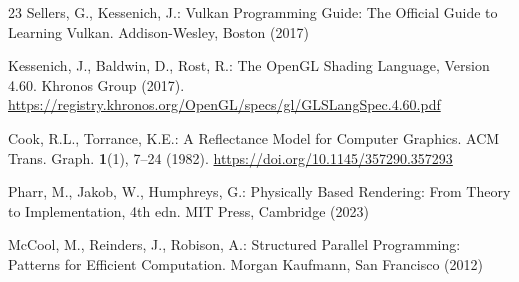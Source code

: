 \documentclass{svproc}
\begin{document}
\begin{thebibliography}{23}
Sellers, G., Kessenich, J.: Vulkan Programming Guide: The Official Guide to Learning Vulkan.
Addison-Wesley, Boston (2017)

Kessenich, J., Baldwin, D., Rost, R.: The OpenGL Shading Language, Version 4.60.
Khronos Group (2017).
\url{https://registry.khronos.org/OpenGL/specs/gl/GLSLangSpec.4.60.pdf}

Cook, R.L., Torrance, K.E.: A Reflectance Model for Computer Graphics.
ACM Trans. Graph. \textbf{1}(1), 7--24 (1982).
\url{https://doi.org/10.1145/357290.357293}

Pharr, M., Jakob, W., Humphreys, G.: Physically Based Rendering: From Theory to Implementation, 4th edn.
MIT Press, Cambridge (2023)

McCool, M., Reinders, J., Robison, A.: Structured Parallel Programming: Patterns for Efficient Computation.
Morgan Kaufmann, San Francisco (2012)

\end{thebibliography}
\end{document}
